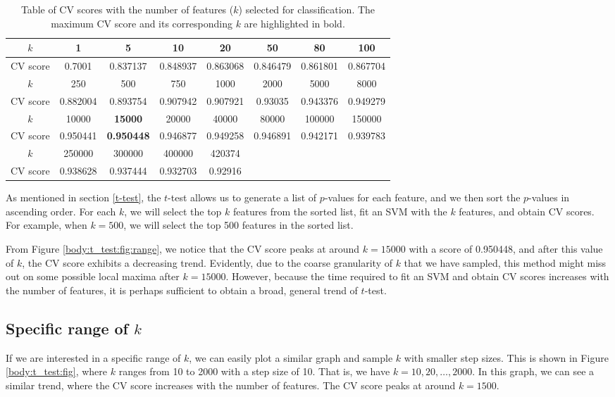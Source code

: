 \documentclass[12pt, twoside, a4paper]{report}
\begin{document}
\begin{table}[h!]
\centering
\begin{tabular}{|c||c|c|c|c|c|c|c|}
\hline
$k$      & 1        & 5        & 10       & 20       & 50       & 80       & 100      \\ \hline
CV score & 0.7001   & 0.837137 & 0.848937 & 0.863068 & 0.846479 & 0.861801 & 0.867704 \\ \hline \hline
$k$      & 250      & 500      & 750      & 1000     & 2000     & 5000     & 8000     \\ \hline
CV score & 0.882004 & 0.893754 & 0.907942 & 0.907921 & 0.93035  & 0.943376 & 0.949279 \\ \hline \hline
$k$      & 10000    & \textbf{15000}    & 20000    & 40000    & 80000    & 100000   & 150000   \\ \hline
CV score & 0.950441 & \textbf{0.950448} & 0.946877 & 0.949258 & 0.946891 & 0.942171 & 0.939783 \\ \hline \hline
$k$      & 250000   & 300000   & 400000   & 420374   &          &          &          \\ \hline
CV score & 0.938628 & 0.937444 & 0.932703 & 0.92916  &          &          &          \\ \hline
\end{tabular}
\caption{Table of CV scores with the number of features ($k$) selected for classification. The maximum CV score and its corresponding $k$ are highlighted in bold.}
\label{t_test:table:range}
\end{table}

As mentioned in section \ref{t-test}, the $t$-test allows us to generate a list of $p$-values for each feature, and we then sort the $p$-values in ascending order. For each $k$, we will select the top $k$ features from the sorted list, fit an SVM with the $k$ features, and obtain CV scores. For example, when $k=500$, we will select the top 500 features in the sorted list.

From Figure \ref{body:t_test:fig:range}, we notice that the CV score peaks at around $k=15000$ with a score of 0.950448, and after this value of $k$, the CV score exhibits a decreasing trend. Evidently, due to the coarse granularity of $k$ that we have sampled, this method might miss out on some possible local maxima after $k=15000$. However, because the time required to fit an SVM and obtain CV scores increases with the number of features, it is perhaps sufficient to obtain a broad, general trend of $t$-test.

\subsection{Specific range of $k$}
If we are interested in a specific range of $k$, we can easily plot a similar graph and sample $k$ with smaller step sizes. This is shown in Figure \ref{body:t_test:fig}, where $k$ ranges from 10 to 2000 with a step size of 10. That is, we have $k=10,20, \dots, 2000$. In this graph, we can see a similar trend, where the CV score increases with the number of features. The CV score peaks at around $k=1500$.
\end{document}
